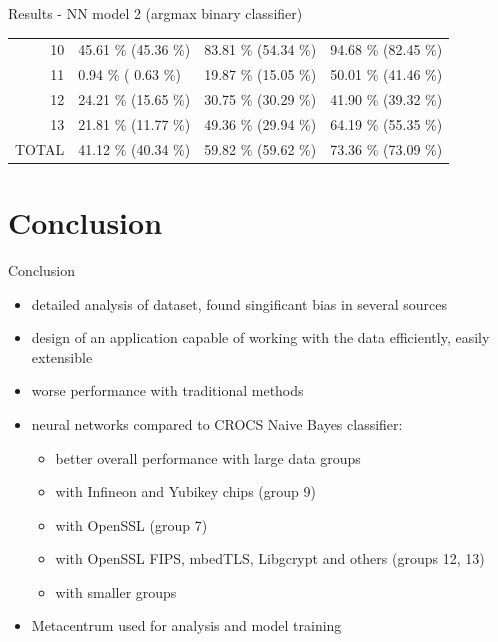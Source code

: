 \documentclass{beamer}
\begin{document}
\begin{darkframes}
\begin{frame}{Results - NN model 2 (argmax binary classifier)}
\begin{table}[!b]
{\begin{tabularx}{\textwidth}{r|X|X|X}
10    & 45.61 \% {\color[HTML]{9B9B9B} (45.36 \%)} & 83.81 \% {\color[HTML]{9B9B9B} (54.34 \%)} & 94.68 \% {\color[HTML]{9B9B9B} (82.45 \%)} \\

11    & 0.94 \% {\color[HTML]{9B9B9B}( 0.63 \%)}  & 19.87 \% {\color[HTML]{9B9B9B} (15.05 \%)} & 50.01 \% {\color[HTML]{9B9B9B} (41.46 \%)} \\

12    & 24.21 \% {\color[HTML]{9B9B9B} (15.65 \%)} & 30.75 \% {\color[HTML]{9B9B9B} (30.29 \%)} & 41.90 \% {\color[HTML]{9B9B9B} (39.32 \%)} \\

13    & 21.81 \% {\color[HTML]{9B9B9B} (11.77 \%)} & 49.36 \% {\color[HTML]{9B9B9B} (29.94 \%)} & 64.19 \% {\color[HTML]{9B9B9B} (55.35 \%)} \\

\toprule
TOTAL & 41.12 \% {\color[HTML]{9B9B9B} (40.34 \%)} & 59.82 \% {\color[HTML]{9B9B9B} (59.62 \%)} & 73.36 \% {\color[HTML]{9B9B9B} (73.09 \%)} \\
\bottomrule
        \end{tabularx}}
      \end{table}
    \end{frame}

    \section{Conclusion}

    \begin{frame}{Conclusion}
      \begin{itemize}
        \item detailed analysis of dataset, found singificant bias in several sources
        \item design of an application capable of working with the data efficiently, easily extensible
        \item worse performance with traditional methods
        \item neural networks compared to CROCS Naive Bayes classifier:
        \begin{itemize}
          \item better overall performance with large data groups
          \item {\color{fibeamer@yellow}{40 \% increase}} with Infineon and Yubikey chips (group 9)
          \item {\color{fibeamer@yellow}{15 \% increase}} with OpenSSL (group 7)
          \item {\color{fibeamer@yellow}{10 \% increase}} with OpenSSL FIPS, mbedTLS, Libgcrypt and others (groups 12, 13)
          \item {\color{fibeamer@lightRed}{decrease}} with smaller groups
        \end{itemize}
        \item Metacentrum used for analysis and model training
      \end{itemize}
    \end{frame}


\end{darkframes}
\end{document}
